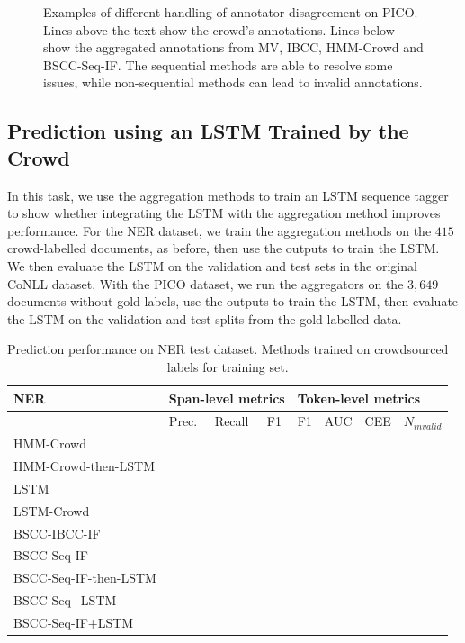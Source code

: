 \begin{figure}
{}
\caption{Examples of different handling of annotator disagreement on PICO. 
Lines above the text show the crowd's annotations. Lines below show the aggregated annotations from MV, IBCC, HMM-Crowd and BSCC-Seq-IF.
The sequential methods are able to resolve some issues, 
while non-sequential methods can lead to invalid annotations. }
\label{fig:disagreements}
\end{figure}

\subsection{Prediction using an LSTM Trained by the Crowd}\label{sec:task2}

In this task, we use the aggregation methods to train an LSTM sequence tagger \cite{lample2016}
to show whether integrating the LSTM with the aggregation method improves performance.
For the NER dataset, we train the aggregation methods on the $415$ crowd-labelled documents, as before,
then use the outputs to train the LSTM. We then evaluate the LSTM on the validation and test sets
in the original CoNLL dataset.
With the PICO dataset, we run the aggregators on the $3,649$ documents without gold labels, 
use the outputs to train the LSTM, then evaluate the LSTM on the validation and test splits from the gold-labelled data.


\begin{table}
\begin{tabularx}{\textwidth}{| l | X | X | X | X | X | X | X |}
\hline
NER & \multicolumn{3}{|l|}{Span-level metrics}                     & \multicolumn{4}{|l|}{Token-level metrics} \\ \hline 
& Prec. & Recall & F1 & F1 & AUC & CEE & $N_{invalid}$  \\ \hline
HMM-Crowd & \\ 
HMM-Crowd-then-LSTM &\\ 
LSTM & \\ 
LSTM-Crowd & \\ \hline
BSCC-IBCC-IF & \\
BSCC-Seq-IF & \\ \hline
BSCC-Seq-IF-then-LSTM &\\
BSCC-Seq+LSTM &\\
BSCC-Seq-IF+LSTM &\\
\hline
\end{tabularx}
\caption{Prediction performance on NER test dataset. Methods trained on crowdsourced labels for training set.}
\label{tab:prediction_results_ner}
\end{table}

